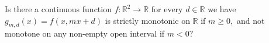 Is there a continuous function $ f: \mathbb {R} ^ {2} \rightarrow \mathbb {R} $  for every  $ d \in  \mathbb {R} $ we have $ g_{m,d}(x) = f (x, m x + d) $ is strictly monotonic on $ \mathbb {R} $ if $ m \ge 0, $ and not monotone on any non-empty open interval if $ m <0? $